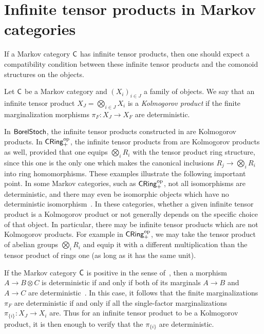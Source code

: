 \documentclass[11pt]{article}
\begin{document}
\section{Infinite tensor products in Markov categories}
\label{infprod_markov}

If a Markov category $\mathsf{C}$ has infinite tensor products, then one should expect a compatibility condition between these infinite tensor products and the comonoid structures on the objects. %

\begin{definition}
    \label{defn_kolmogorov_ext}
    Let $\mathsf{C}$ be a Markov category and $(X_i)_{i \in J}$ a family of objects. We say that an infinite tensor product $X_J = \bigotimes_{i \in J} X_i$ is a \emph{Kolmogorov product} if the finite marginalization morphisms $\pi_F : X_J \to X_F$ are deterministic.
\end{definition}

In $\operatorname{\mathsf{BorelStoch}}$, the infinite tensor products constructed in  are Kolmogorov products. In $\operatorname{\mathsf{CRing}}_+^{\mathrm{op}}$, the infinite tensor products from  are Kolmogorov products as well, provided that one equips $\bigotimes_i R_i$ with the tensor product ring structure, since this one is the only one which makes the canonical inclusions $R_j \to \bigotimes_i R_i$ into ring homomorphisms. These examples illustrate the following important point. In some Markov categories, such as $\operatorname{\mathsf{CRing}}_+^{\mathrm{op}}$, not all isomorphisms are deterministic, and there may even be isomorphic objects which have no deterministic isomorphism~\cite[Remark~10.10]{markov_cats}. In these categories, whether a given infinite tensor product is a Kolmogorov product or not generally depends on the specific choice of that object. In particular, there may be infinite tensor products which are not Kolmogorov products. For example in $\operatorname{\mathsf{CRing}}_+^{\mathrm{op}}$, we may take the tensor product of abelian groups $\bigotimes_i R_i$ and equip it with a different multiplication than the tensor product of rings one (as long as it has the same unit).

\begin{remark}
	If the Markov category $\mathsf{C}$ is positive in the sense of~\cite[Definition~11.22]{markov_cats}, then a morphism $A \to B \otimes C$ is deterministic if and only if both of its marginals $A \to B$ and $A \to C$ are deterministic~\cite[Corollary~12.15]{markov_cats}. In this case, it follows that the finite marginalizations $\pi_F$ are deterministic if and only if all the single-factor marginalizations $\pi_{\{i\}} : X_J \to X_i$ are. Thus for an infinite tensor product to be a Kolmogorov product, it is then enough to verify that the $\pi_{\{i\}}$ are deterministic.
\end{remark}
\end{document}
